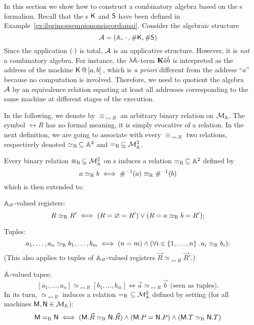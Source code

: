 
In this section we show how to construct a combinatory algebra based on the \am s formalism. %
Recall that the \am s $\mathsf K$ and $\mathsf S$ have been defined in Example~\ref{ex:ilprimoesempiononsiscordamai}. Consider the algebraic structure %
\[
	\mathcal{A} = (\mathbb{A},\,\cdot \,,\#\mathsf{K},\#\mathsf S)
\]
Since the application $(\cdot)$ is total, $\mathcal{A}$ is an applicative structure.
However, it is \emph{not} a combinatory algebra.
For instance, the $\lambda\mathbb{A}$-term ${\mathbf{K}}\hat a\hat b$ is interpreted as the address of the machine $\mathsf{K}\,@\,{[}a,b{]}\,$, which is \emph{a priori} different from the address ``$a$'' because no computation is involved.
Therefore, we need to quotient the algebra $\mathcal{A}$ by an equivalence relation equating at least all addresses corresponding to the same machine at different stages of the execution.

In the following, we denote by $\equiv_{\rel R}$ an arbitrary binary relation on $\mathcal{M}_{\mathbb{A}}$. The symbol ${\rel R}$ has no formal meaning, it is simply evocative of a relation.
In the next definition, we are going to associate with every $\equiv_{\rel R}$ two relations, respectively denoted $\simeq_{\text{\sc R}}\,\subseteq \mathbb{A}^2$ and $=_{\text{\sc R}}\,\subseteq \mathcal{M}_{\mathbb{A}}^2$.

\begin{defi}\label{def:inducingequivalences}
Every binary relation $\equiv_{\text{\sc R}}\,\subseteq\mathcal{M}_{\mathbb{A}}^2$ on \am s induces a relation $\simeq_{\text{\sc R}}\,\subseteq \mathbb{A}^2$ defined by %
\[
	a\simeq_{\text{\sc R}} b\iff \#^{-1}(a)\equiv_{\text{\sc R}} \#^{-1}(b)
\]
which is then extended to:
\bsub
\item $\mathbb{A}_\varnothing$-valued registers:
\[
	R\simeq_{\text{\sc R}} R' \iff (R = \varnothing = R')\lor (R = a \simeq_{\text{\sc R}} b =R');
\]
\item Tuples:
\[
	a_1,\dots,a_n \simeq_{\text{\sc R}} b_1,\dots,b_m \iff (n = m)\land (\forall i\in\{1,\dots,n\}\,.\, a_i\simeq_{\text{\sc R}} b_i);
\]
(This also applies to tuples of $\mathbb{A}_\varnothing$-valued registers $\vec R\simeq_{\rel R} \vec R'$.)
\item  $\mathbb{A}$-valued tapes:
	\[
		[a_1,\dots,a_n]\simeq_{\rel R} [b_1,\dots,b_m]\iff \vec a \simeq_{\rel R} \vec b \textrm{ (seen as tuples).}
	\]
\esub
\noindent
In its turn, $\simeq_{\rel R}$ induces a relation $=_{\rel R}\ \subseteq\cM^2$ defined by setting (for all machines $\mathsf M,\mathsf N\in\mathcal{M}_{\mathbb{A}}$):
\[
	\mathsf M =_{\text{\sc R}} \mathsf N \iff (\mathsf M.\vec R \simeq_{\text{\sc R}}\mathsf N.\vec R)\land (\mathsf M.P = \mathsf N.P)\land(\mathsf M.T \simeq_{\text{\sc R}}\mathsf N.T)
\]
\end{defi}

